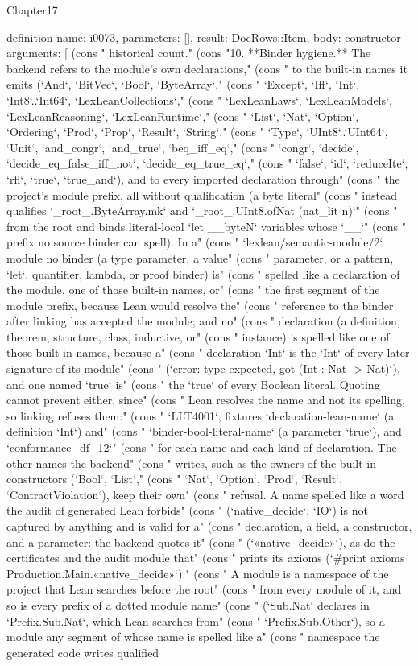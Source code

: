 \begin{lexlean}{Chapter17}
\begin{semanticmodule}
definition{
  name: i0073,
  parameters: [],
  result: DocRows::Item,
  body: constructor{
    arguments: [
      (cons "   historical count." (cons "10. **Binder hygiene.** The backend refers to the module's own declarations," (cons "    to the built-in names it emits (`And`, `BitVec`, `Bool`, `ByteArray`," (cons "    `Except`, `Iff`, `Int`, `Int8`..`Int64`, `LexLeanCollections`," (cons "    `LexLeanLaws`, `LexLeanModels`, `LexLeanReasoning`, `LexLeanRuntime`," (cons "    `List`, `Nat`, `Option`, `Ordering`, `Prod`, `Prop`, `Result`, `String`," (cons "    `Type`, `UInt8`..`UInt64`, `Unit`, `and_congr`, `and_true`, `beq_iff_eq`," (cons "    `congr`, `decide`, `decide_eq_false_iff_not`, `decide_eq_true_eq`," (cons "    `false`, `id`, `reduceIte`, `rfl`, `true`, `true_and`), and to every imported declaration through" (cons "    the project's module prefix, all without qualification (a byte literal" (cons "    instead qualifies `_root_.ByteArray.mk` and `_root_.UInt8.ofNat (nat_lit n)`" (cons "    from the root and binds literal-local `let __byteN` variables whose `__`" (cons "    prefix no source binder can spell). In a" (cons "    `lexlean/semantic-module/2` module no binder (a type parameter, a value" (cons "    parameter, or a pattern, `let`, quantifier, lambda, or proof binder) is" (cons "    spelled like a declaration of the module, one of those built-in names, or" (cons "    the first segment of the module prefix, because Lean would resolve the" (cons "    reference to the binder after linking has accepted the module; and no" (cons "    declaration (a definition, theorem, structure, class, inductive, or" (cons "    instance) is spelled like one of those built-in names, because a" (cons "    declaration `Int` is the `Int` of every later signature of its module" (cons "    (`error: type expected, got (Int : Nat -> Nat)`), and one named `true` is" (cons "    the `true` of every Boolean literal. Quoting cannot prevent either, since" (cons "    Lean resolves the name and not its spelling, so linking refuses them:" (cons "    `LLT4001`, fixtures `declaration-lean-name` (a definition `Int`) and" (cons "    `binder-bool-literal-name` (a parameter `true`), and `conformance_df_12`" (cons "    for each name and each kind of declaration. The other names the backend" (cons "    writes, such as the owners of the built-in constructors (`Bool`, `List`," (cons "    `Nat`, `Option`, `Prod`, `Result`, `ContractViolation`), keep their own" (cons "    refusal. A name spelled like a word the audit of generated Lean forbids" (cons "    (`native_decide`, `IO`) is not captured by anything and is valid for a" (cons "    declaration, a field, a constructor, and a parameter: the backend quotes it" (cons "    (`«native_decide»`), as do the certificates and the audit module that" (cons "    prints its axioms (`#print axioms Production.Main.«native_decide»`)." (cons "    A module is a namespace of the project that Lean searches before the root" (cons "    from every module of it, and so is every prefix of a dotted module name" (cons "    (`Sub.Nat` declares in `Prefix.Sub.Nat`, which Lean searches from" (cons "    `Prefix.Sub.Other`), so a module any segment of whose name is spelled like a" (cons "    namespace the generated code writes qualified }}
\end{semanticmodule}
\end{lexlean}
